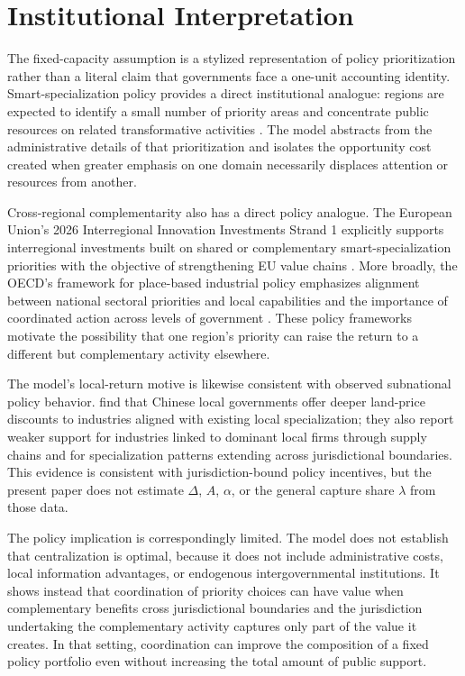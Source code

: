 \section{Institutional Interpretation}
\label{sec:institutional}

The fixed-capacity assumption is a stylized representation of policy prioritization rather than a literal claim that governments face a one-unit accounting identity. Smart-specialization policy provides a direct institutional analogue: regions are expected to identify a small number of priority areas and concentrate public resources on related transformative activities \citep{ForayEichlerKeller2021}. The model abstracts from the administrative details of that prioritization and isolates the opportunity cost created when greater emphasis on one domain necessarily displaces attention or resources from another.

Cross-regional complementarity also has a direct policy analogue. The European Union's 2026 Interregional Innovation Investments Strand 1 explicitly supports interregional investments built on shared or complementary smart-specialization priorities with the objective of strengthening EU value chains \citep{EISMEA2026}. More broadly, the OECD's framework for place-based industrial policy emphasizes alignment between national sectoral priorities and local capabilities and the importance of coordinated action across levels of government \citep{OECD2025}. These policy frameworks motivate the possibility that one region's priority can raise the return to a different but complementary activity elsewhere.

The model's local-return motive is likewise consistent with observed subnational policy behavior. \citet{TianWangZhang2027} find that Chinese local governments offer deeper land-price discounts to industries aligned with existing local specialization; they also report weaker support for industries linked to dominant local firms through supply chains and for specialization patterns extending across jurisdictional boundaries. This evidence is consistent with jurisdiction-bound policy incentives, but the present paper does not estimate $\Delta$, $A$, $\alpha$, or the general capture share $\lambda$ from those data.

The policy implication is correspondingly limited. The model does not establish that centralization is optimal, because it does not include administrative costs, local information advantages, or endogenous intergovernmental institutions. It shows instead that coordination of priority choices can have value when complementary benefits cross jurisdictional boundaries and the jurisdiction undertaking the complementary activity captures only part of the value it creates. In that setting, coordination can improve the composition of a fixed policy portfolio even without increasing the total amount of public support.
